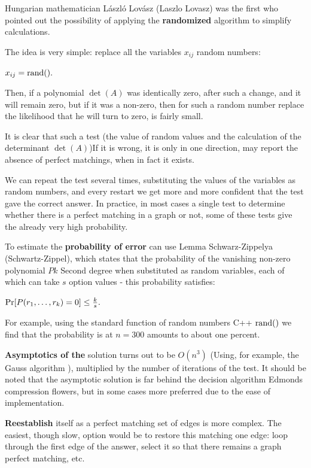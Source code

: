 Hungarian mathematician László Lovász (Laszlo Lovasz) was the first who pointed out the possibility of applying the \textbf{randomized} algorithm to simplify calculations.

The idea is very simple: replace all the variables $x_ {ij}$ random numbers:

$x_ {ij} = {\rm rand}().$

Then, if a polynomial $\det (A)$ was identically zero, after such a change, and it will remain zero, but if it was a non-zero, then for such a random number replace the likelihood that he will turn to zero, is fairly small.

It is clear that such a test (the value of random values ​​and the calculation of the determinant $\det (A)$)If it is wrong, it is only in one direction, may report the absence of perfect matchings, when in fact it exists.

We can repeat the test several times, substituting the values ​​of the variables as random numbers, and every restart we get more and more confident that the test gave the correct answer. In practice, in most cases a single test to determine whether there is a perfect matching in a graph or not, some of these tests give the already very high probability.

To estimate the \textbf{probability of error} can use Lemma Schwarz-Zippelya (Schwartz-Zippel), which states that the probability of the vanishing non-zero polynomial $P$$k$ Second degree when substituted as random variables, each of which can take $s$ option values ​​- this probability satisfies:

${\rm Pr} [P (r_1, \ldots, r_k) = 0] \le \frac {k} {s}.$

For example, using the standard function of random numbers C++ $\rm rand()$ we find that the probability is at $n = 300$ amounts to about one percent.

\textbf{Asymptotics of the} solution turns out to be $O (n ^ 3)$ (Using, for example, the Gauss algorithm ), multiplied by the number of iterations of the test. It should be noted that the asymptotic solution is far behind the decision algorithm Edmonds compression flowers, but in some cases more preferred due to the ease of implementation.

\textbf{Reestablish} itself as a perfect matching set of edges is more complex. The easiest, though slow, option would be to restore this matching one edge: loop through the first edge of the answer, select it so that there remains a graph perfect matching, etc.

